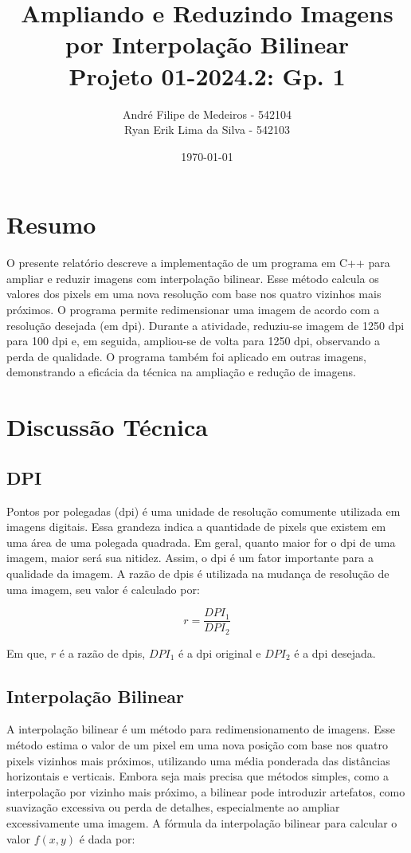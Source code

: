 \documentclass{article}
\title{Ampliando e Reduzindo Imagens por Interpolação Bilinear\\ Projeto 01-2024.2: Gp. 1}
\author{André Filipe de Medeiros - 542104\\ Ryan Erik Lima da Silva - 542103}
\date{\today}
\begin{document}
\maketitle

\newpage
\section{Resumo}
O presente relatório descreve a implementação de um programa em C++ para ampliar e reduzir imagens com interpolação bilinear. Esse método calcula os valores dos pixels em uma nova resolução com base nos quatro vizinhos mais próximos. O programa permite redimensionar uma imagem de acordo com a resolução desejada (em dpi). 
Durante a atividade, reduziu-se imagem de 1250 dpi para 100 dpi e, em seguida, ampliou-se de volta para 1250 dpi, observando a perda de qualidade. O programa também foi aplicado em outras imagens, demonstrando a eficácia da técnica na ampliação e redução de imagens.

\section{Discussão Técnica}

\subsection{DPI}
Pontos por polegadas (dpi) é uma unidade de resolução comumente utilizada em imagens digitais. Essa grandeza indica a quantidade de pixels que existem em uma área de uma polegada quadrada. Em geral, quanto maior for o dpi de uma imagem, maior será sua nitidez. Assim, o dpi é um fator importante para a qualidade da imagem. A razão de dpis é 
utilizada na mudança de resolução de uma imagem, seu valor é calculado por:

\begin{equation}
    r  = \frac{DPI_{1}}{DPI_{2}}
\end{equation}

Em que, $r$ é a razão de dpis, $DPI_{1}$ é a dpi original e $DPI_2$ é a dpi desejada.

\subsection{Interpolação Bilinear}
A interpolação bilinear é um método para redimensionamento de imagens. Esse método estima o valor de um pixel em uma nova posição com base nos quatro pixels vizinhos mais próximos, utilizando uma média ponderada das distâncias horizontais e verticais. Embora seja mais precisa que métodos simples, como a interpolação por vizinho mais próximo, a bilinear pode introduzir artefatos, como suavização excessiva ou perda de detalhes, especialmente ao ampliar excessivamente uma imagem. A fórmula da interpolação bilinear para calcular o valor \( f(x, y) \) é dada por:
\end{document}
